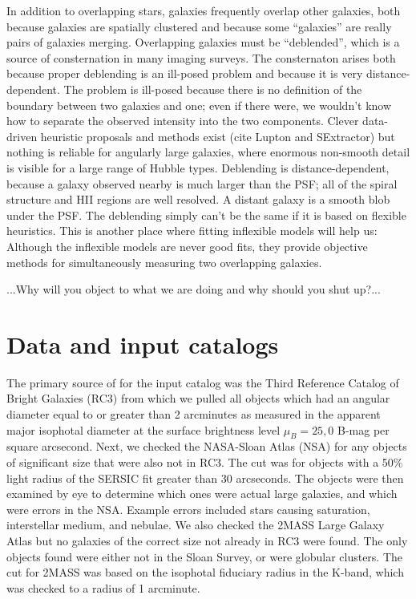 \documentclass[12pt,preprint,pdftex]{aastex}
\begin{document}
In addition to overlapping stars, galaxies frequently overlap other
galaxies, both because galaxies are spatially clustered and because
some ``galaxies'' are really pairs of galaxies merging.  Overlapping
galaxies must be ``deblended'', which is a source of consternation in
many imaging surveys.  The consternaton arises both because proper
deblending is an ill-posed problem and because it is very
distance-dependent.  The problem is ill-posed because there is no
definition of the boundary between two galaxies and one; even if there
were, we wouldn't know how to separate the observed intensity into the
two components.  Clever data-driven heuristic proposals and methods
exist (cite Lupton and SExtractor) but nothing is reliable for
angularly large galaxies, where enormous non-smooth detail is visible
for a large range of Hubble types.  Deblending is distance-dependent,
because a galaxy observed nearby is much larger than the PSF; all of
the spiral structure and HII regions are well resolved.  A distant
galaxy is a smooth blob under the PSF.  The deblending simply can't be
the same if it is based on flexible heuristics.  This is another place
where fitting inflexible models will help us: Although the inflexible
models are never good fits, they provide objective methods for
simultaneously measuring two overlapping galaxies.

...Why will you object to what we are doing and why should you shut up?...

\section{Data and input catalogs}
The primary source of for the input catalog was the Third Reference Catalog of Bright Galaxies (RC3) from which we pulled all objects which had an angular diameter equal to or greater than 2 arcminutes as measured in the apparent major isophotal diameter at the surface brightness level $\mu_B = 25,0$ B-mag per square arcsecond. Next, we checked the NASA-Sloan Atlas (NSA) for any objects of significant size that were also not in RC3. The cut was for objects with a 50\% light radius of the SERSIC fit greater than 30 arcseconds. The objects were then examined by eye to determine which ones were actual large galaxies, and which were errors in the NSA. Example errors included stars causing saturation, interstellar medium, and nebulae. We also checked the 2MASS Large Galaxy Atlas but no galaxies of the correct size not already in RC3 were found. The only objects found were either not in the Sloan Survey, or were globular clusters. The cut for 2MASS was based on the isophotal fiduciary radius in the K-band, which was checked to a radius of 1 arcminute.
\end{document}
